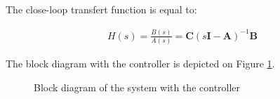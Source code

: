 % 
%    
%   
 
 
 
 The close-loop transfert function is equal to:
 
 \begin{multline} 
 H(s) = \frac{B(s)}{A(s)} = \bm{C}(s\bm{I}-\bm{A})^{-1}\bm{B}
 \end{multline}
  
 The block diagram with the controller is depicted on Figure \ref{bloc}.
 
\begin{figure}[hb]
\caption{Block diagram of the system with the controller}
\label{bloc}
\end{figure}

